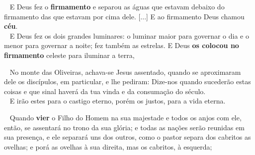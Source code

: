 \documentclass[12pt,aspectratio=169]{beamer}
\newcommand{\ver}[1]{%
    \raisebox{0.50ex}{%
        \scalebox{1.1}{%
            \pmb{\textbf{\textcolor{BSpbg}{#1}}}%
        }%
    }%
}
\newcommand{\QUOTE}[1]{%
    \par\noindent\hspace*{0.1\linewidth}%
    \begin{minipage}{0.8\linewidth}%
        \linespread{1.35}\large{#1}%
    \end{minipage}%
}
\newcommand{\RED}[1]{{\textcolor{TXred}{#1}}}
\newcommand{\ORA}[1]{{\textcolor{TXora}{#1}}}
\newcommand{\YEL}[1]{{\textcolor{TXyel}{#1}}}
\newcommand{\GRE}[1]{{\textcolor{TXgre}{#1}}}
\newcommand{\CYA}[1]{{\textcolor{TXcya}{#1}}}
\newcommand{\BLU}[1]{{\textcolor{TXblu}{#1}}}
\newcommand{\MAG}[1]{{\textcolor{TXmag}{#1}}}
\newcommand{\BRI}[1]{{\textcolor{BSpbg}{#1}}}   %
\begin{document}
    \begin{frame}
        \QUOTE{%
            \ver{(A21) Gn~1.7,8}~%
            E Deus fez o \YEL{\textbf{firmamento}} e  \ORA{separou}  as  águas  que  estavam
            debaixo do firmamento das que estavam por cima dele. [...] E \YEL{ao  firmamento
            Deus chamou \textbf{céu}}. \\[\bigskipamount]
            \ver{(A21) Gn~1.16,17}~%
            E Deus fez os \CYA{dois grandes luminares}: o luminar maior para governar o  dia
            e o  menor  para  governar  a  noite;  \MAG{fez  também  as  estrelas}.  E  Deus
            \GRE{\textbf{os colocou no firmamento} celeste} para iluminar a terra,
        }
    \end{frame}


    \begin{frame}
        \QUOTE{%
            \ver{(ARA) Mt~24.3}~%
            No monte das Oliveiras, achava-se Jesus assentado, quando se aproximaram dele os
            discípulos, \BRI{em particular}, e lhe pediram: Dize-nos  \YEL{quando  sucederão
            estas coisas} e \GRE{que sinal haverá da tua  vinda}  e  da  \MAG{consumação  do
            século}. \\[\bigskipamount]
            \ver{(ARA) Mt~25.46}~%
            E irão estes para o \RED{castigo eterno}, porém  os  justos,  para  a  \GRE{vida
            eterna}.
        }
    \end{frame}

    \begin{frame}
        \QUOTE{%
            \ver{(ARA) Mt~25.31--33}~%
            \YEL{Quando \textbf{vier}} o Filho do Homem na sua majestade e  todos  os  anjos
            com ele,  então,  se  assentará  no  \GRE{trono  da  sua  glória};  e  todas  as
            \CYA{nações serão reunidas em  sua  presença},  e  ele  \ORA{separará}  uns  dos
            outros, como o pastor separa dos cabritos as ovelhas; e porá as  ovelhas  à  sua
            \BLU{direita}, mas os cabritos, à \RED{esquerda};
        }
    \end{frame}



\end{document}
